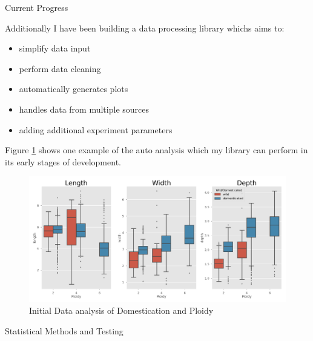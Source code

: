 \documentclass[final]{beamer}
\begin{document}
\begin{frame}{}
\begin{textblock}{28}
\begin{block}{Current Progress}
      \vspace{0.3cm}

      Additionally I have been building a data processing library whichs aims to:
      \begin{multicols}{2}
        
        \begin{itemize}
        \item simplify data input
        \item perform data cleaning
        \item automatically generates plots
        \end{itemize}
        \columnbreak
        \begin{itemize}
        \item handles data from multiple sources
        \item adding additional experiment parameters
        \end{itemize}

      \end{multicols}

      \vspace{0.3cm}

      Figure \ref{fig:initalboxplots} shows one example of the auto analysis which my library
      can perform in its early stages of development.
      
      \begin{figure}[htb]
        \centering
        \includegraphics[width=22cm]{domesticated.png}
        \caption{\label{fig:initalboxplots}Initial Data analysis of Domestication and Ploidy}
      \end{figure}
      
    \end{block}

    
    \begin{block}{Statistical Methods and Testing}


\end{block}
\end{textblock}
\end{frame}
\end{document}

